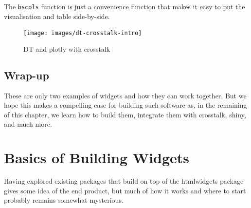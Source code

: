 \documentclass[10pt,]{krantz}
\makeatletter
\newenvironment{Shaded}{\begin{snugshade}}{\end{snugshade}}
\newcommand{\DataTypeTok}[1]{\textcolor[rgb]{0.27,0.27,0.27}{#1}}
\newcommand{\KeywordTok}[1]{\textcolor[rgb]{0.27,0.27,0.27}{\textbf{#1}}}
\newcommand{\NormalTok}[1]{#1}
\newcommand{\OperatorTok}[1]{\textcolor[rgb]{0.43,0.43,0.43}{\textbf{#1}}}
\newcommand{\StringTok}[1]{\textcolor[rgb]{0.5,0.5,0.5}{#1}}
\newenvironment{kframe}{%
\medskip{}
\setlength{\fboxsep}{.8em}
 \def\at@end@of@kframe{}%
 \ifinner\ifhmode%
  \def\at@end@of@kframe{\end{minipage}}%
  \begin{minipage}{\columnwidth}%
 \fi\fi%
 \def\FrameCommand##1{\hskip\@totalleftmargin \hskip-\fboxsep
 \colorbox{shadecolor}{##1}\hskip-\fboxsep
     \hskip-\linewidth \hskip-\@totalleftmargin \hskip\columnwidth}%
 \MakeFramed {\advance\hsize-\width
   \@totalleftmargin\z@ \linewidth\hsize
   \@setminipage}}%
 {\par\unskip\endMakeFramed%
 \at@end@of@kframe}
\renewenvironment{Shaded}{\begin{kframe}}{\end{kframe}}
\makeatother
\begin{document}
The \texttt{bscols} function is just a convenience function that makes it easy to put the visualisation and table side-by-side.

\begin{Shaded}
\end{Shaded}

\begin{figure}[H]

{\centering \texttt{[image: images/dt-crosstalk-intro]} 

}

\caption{DT and plotly with crosstalk}\label{fig:dt-example-crosstalk}
\end{figure}

\hypertarget{widgets-intro-conclude}{%
\section{Wrap-up}\label{widgets-intro-conclude}}

These are only two examples of widgets and how they can work together. But we hope this makes a compelling case for building such software as, in the remaining of this chapter, we learn how to build them, integrate them with crosstalk, shiny, and much more.

\hypertarget{widgets-basics}{%
\chapter{Basics of Building Widgets}\label{widgets-basics}}

Having explored existing packages that build on top of the htmlwidgets package gives some idea of the end product, but much of how it works and where to start probably remains somewhat mysterious.
\end{document}
